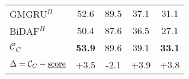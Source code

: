\begin{table}[!h]
\begin{center}
{\begin{tabular}{lcccc}
$\text{GMGRU}^{H}$                             & 52.6                 & 89.5                   & 37.1                 & 31.1                 \\
$\text{BiDAF}^{H}$                             & 50.4                 & 87.6                   & 36.5                 & 27.1                 \\ \midrule
  $\mathcal{C}_{C}$                            & {\bf 53.9}           & 89.6                   & 39.1                 & {\bf 33.1}           \\
$\Delta=\mathcal{C}_{C} - \text{\underline{score}}$ & {\footnotesize +3.5} & {\footnotesize -2.1}   & {\footnotesize +3.9} & {\footnotesize +3.8} \\
  \bottomrule
\end{tabular}}
\end{center}
\end{table}

